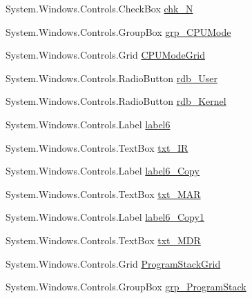 \begin{DoxyCompactItemize}
\item 
System.\+Windows.\+Controls.\+Check\+Box \hyperlink{class_c_p_u___o_s___simulator_1_1_main_window_ab8a23e33c5c71e359574de36ccf8d991}{chk\+\_\+\+N}
\item 
System.\+Windows.\+Controls.\+Group\+Box \hyperlink{class_c_p_u___o_s___simulator_1_1_main_window_a0e549bad0f6778b2ea3fffb6c2d1a2bb}{grp\+\_\+\+C\+P\+U\+Mode}
\item 
System.\+Windows.\+Controls.\+Grid \hyperlink{class_c_p_u___o_s___simulator_1_1_main_window_ab6afb45d3f05517e9df6af167752be77}{C\+P\+U\+Mode\+Grid}
\item 
System.\+Windows.\+Controls.\+Radio\+Button \hyperlink{class_c_p_u___o_s___simulator_1_1_main_window_ab9e8d52c337bc24a24d8282dfbf449c8}{rdb\+\_\+\+User}
\item 
System.\+Windows.\+Controls.\+Radio\+Button \hyperlink{class_c_p_u___o_s___simulator_1_1_main_window_a549c6be690b051f4ab15dce643dec656}{rdb\+\_\+\+Kernel}
\item 
System.\+Windows.\+Controls.\+Label \hyperlink{class_c_p_u___o_s___simulator_1_1_main_window_a8f210008776bb163b4c2c2b160aa52be}{label6}
\item 
System.\+Windows.\+Controls.\+Text\+Box \hyperlink{class_c_p_u___o_s___simulator_1_1_main_window_ac6e0cfcdd72688d7bffd100ce6d11a28}{txt\+\_\+\+I\+R}
\item 
System.\+Windows.\+Controls.\+Label \hyperlink{class_c_p_u___o_s___simulator_1_1_main_window_a18612502a8ab2d53d85434e426785022}{label6\+\_\+\+Copy}
\item 
System.\+Windows.\+Controls.\+Text\+Box \hyperlink{class_c_p_u___o_s___simulator_1_1_main_window_a87f8440246e9f6ace0aa4d69b5bba289}{txt\+\_\+\+M\+A\+R}
\item 
System.\+Windows.\+Controls.\+Label \hyperlink{class_c_p_u___o_s___simulator_1_1_main_window_a890bd54d36af19ec881b6a840d6ac8a9}{label6\+\_\+\+Copy1}
\item 
System.\+Windows.\+Controls.\+Text\+Box \hyperlink{class_c_p_u___o_s___simulator_1_1_main_window_a1aa53d1512aa84e476b3649dcda5ced0}{txt\+\_\+\+M\+D\+R}
\item 
System.\+Windows.\+Controls.\+Grid \hyperlink{class_c_p_u___o_s___simulator_1_1_main_window_a59373e8f8822e4efea670d9fb87a1b32}{Program\+Stack\+Grid}
\item 
System.\+Windows.\+Controls.\+Group\+Box \hyperlink{class_c_p_u___o_s___simulator_1_1_main_window_a10687b397ff3a0381a556096a14ed0b0}{grp\+\_\+\+Program\+Stack}
\item 

\end{DoxyCompactItemize}
